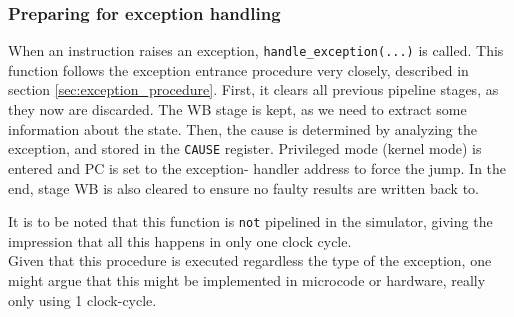 \subsubsection{Preparing for exception handling}
When an instruction raises an exception, \texttt{handle\_exception(...)} is
called. This function follows the exception entrance procedure very closely,
described in section \ref{sec:exception_procedure}.
First, it clears all previous pipeline stages, as they now are discarded. The
WB stage is kept, as we need to extract some information about the state.
Then, the cause is determined by analyzing the exception, and stored in the
\texttt{CAUSE} register.
Privileged mode (kernel mode) is entered and PC is set to the exception-
handler address to force the jump.
In the end, stage WB is also cleared to ensure no faulty results are written
back to.
\iffalse
\begin{lstlisting}[language=C]
bzero(&IF_ID, sizeof(struct reg_if_id));
bzero(&ID_EX, sizeof(struct reg_id_ex));
bzero(&EX_MEM, sizeof(struct reg_ex_mem));
/* Data in MEM_WB is still needed */

/* 1. Save EPC */
core->cp0.regs[REG_EPC] = MEM_WB.next_pc - 4;

uint32_t cause = get_cause(MEM_WB.exception, MEM_WB.is_branch_delay);
core->cp0.regs[REG_CAUSE] = cause;

if(MEM_WB.exception == EXC_AddressErrorLoad
   || MEM_WB.exception == EXC_AddressErrorLoad) {
	core->cp0.regs[REG_BADVADDR] = MEM_WB.BadVAddr;
}

core->cp0.regs[REG_SR] |= SR_EXL;

core->regs[REG_PC] = (uint32_t)0x80000080;

bzero(&MEM_WB, sizeof(struct reg_mem_wb));
\end{lstlisting}
\fi
It is to be noted that this function is \texttt{not} pipelined in the simulator,
giving the impression that all this happens in only one clock cycle.\\
Given that this procedure is executed regardless the type of the exception, one
might argue that this might be implemented in microcode or hardware, really only
using 1 clock-cycle.

